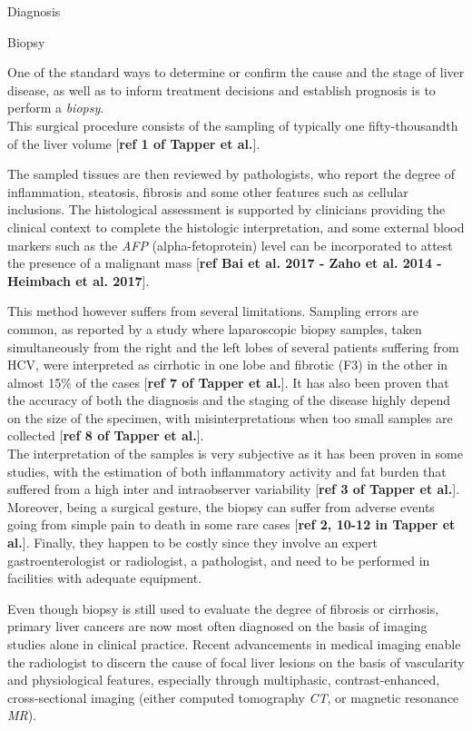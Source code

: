 \documentclass[]{article}
\begin{document}
\protect\hypertarget{anchor-6}{}{}Diagnosis

\protect\hypertarget{anchor-7}{}{}Biopsy

One of the standard ways to determine or confirm the cause and the stage
of liver disease, as well as to inform treatment decisions and establish
prognosis is to perform a \emph{biopsy}.\\
This surgical procedure consists of the sampling of typically one
fifty-thousandth of the liver volume {[}\textbf{ref 1 of Tapper et
al.}{]}.

The sampled tissues are then reviewed by pathologists, who report the
degree of inflammation, steatosis, fibrosis and some other features such
as cellular inclusions. The histological assessment is supported by
clinicians providing the clinical context to complete the histologic
interpretation, and some external blood markers such as the \emph{AFP}
(alpha-fetoprotein) level can be incorporated to attest the presence of
a malignant mass {[}\textbf{ref Bai et al. 2017 - Zaho et al. 2014 -
Heimbach et al. 2017}{]}.

This method however suffers from several limitations. Sampling errors
are common, as reported by a study where laparoscopic biopsy samples,
taken simultaneously from the right and the left lobes of several
patients suffering from HCV, were interpreted as cirrhotic in one lobe
and fibrotic (F3) in the other in almost 15\% of the cases
{[}\textbf{ref 7 of Tapper et al.}{]}. It has also been proven that the
accuracy of both the diagnosis and the staging of the disease highly
depend on the size of the specimen, with misinterpretations when too
small samples are collected {[}\textbf{ref 8 of Tapper et al.}{]}.\\
The interpretation of the samples is very subjective as it has been
proven in some studies, with the estimation of both inflammatory
activity and fat burden that suffered from a high inter and
intraobserver variability {[}\textbf{ref 3 of Tapper et al.}{]}.
Moreover, being a surgical gesture, the biopsy can suffer from adverse
events going from simple pain to death in some rare cases {[}\textbf{ref
2, 10-12 in Tapper et al.}{]}. Finally, they happen to be costly since
they involve an expert gastroenterologist or radiologist, a pathologist,
and need to be performed in facilities with adequate equipment.

Even though biopsy is still used to evaluate the degree of fibrosis or
cirrhosis, primary liver cancers are now most often diagnosed on the
basis of imaging studies alone in clinical practice. Recent advancements
in medical imaging enable the radiologist to discern the cause of focal
liver lesions on the basis of vascularity and physiological features,
especially through multiphasic, contrast-enhanced, cross-sectional
imaging (either computed tomography \emph{CT}, or magnetic resonance
\emph{MR}).
\end{document}
